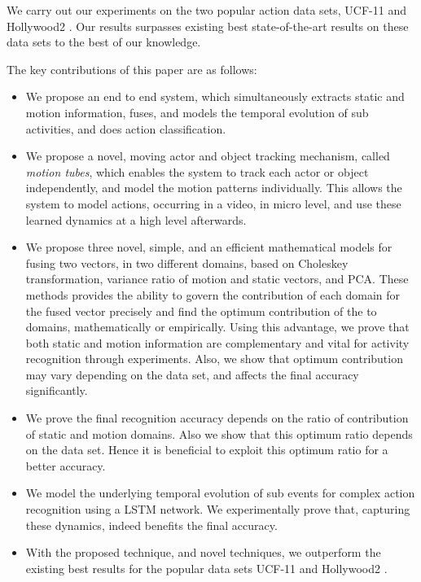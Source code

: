 We carry out our experiments on the two popular action data sets, UCF-11 \cite{liu2009recognizing}
and Hollywood2 \cite{marszalek2009actions}. Our results surpasses existing best state-of-the-art
results on these data sets to the best of our knowledge.

The key contributions of this paper are as follows:

 \begin{itemize}
  \item We propose an end to end system, which simultaneously extracts static and motion information, fuses, and models the
temporal evolution of sub activities, and does action classification.
  \item We propose a novel, moving actor and object tracking mechanism, called \textit{motion tubes},
which enables the system to track each actor or object independently, and model the motion patterns individually.
This allows the system to model actions, occurring in a video, in micro level, and use these learned dynamics
at a high level afterwards.
 \item We propose three novel, simple, and an efficient mathematical models for fusing two vectors,
in two different
domains, based on Choleskey transformation, variance ratio of motion and static vectors, and PCA. These methods provides
the ability to govern the contribution of each domain
for the fused vector precisely and find the optimum contribution of the to domains, mathematically or empirically. Using this advantage, we prove that
both static and motion information are complementary and vital for activity recognition through experiments. Also, we show that optimum contribution
may vary depending on the data set, and affects the final accuracy significantly.
 \item We prove the final recognition accuracy depends on the ratio of contribution of static and motion domains. Also we show that
 this optimum ratio depends on the data set. Hence it is beneficial to exploit this optimum ratio for a better accuracy.
  \item We model the underlying
temporal evolution of sub events for complex action recognition using a LSTM network. We experimentally
prove that, capturing these dynamics, indeed benefits the final accuracy.

\item With the proposed technique, and novel techniques,
we outperform the existing best results for the popular data sets UCF-11 \cite{liu2009recognizing}
and Hollywood2 \cite{marszalek2009actions}.
 \end{itemize}




